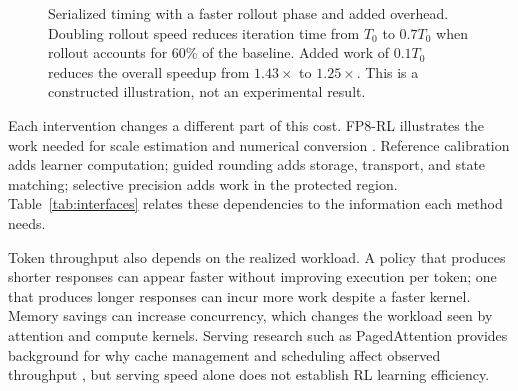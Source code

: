 \begin{figure}[!htb]
\centering
\caption{Serialized timing with a faster rollout phase and added overhead. Doubling rollout speed reduces iteration time from $T_0$ to $0.7T_0$ when rollout accounts for $60\%$ of the baseline. Added work of $0.1T_0$ reduces the overall speedup from $1.43\times$ to $1.25\times$. This is a constructed illustration, not an experimental result.}\label{fig:timing}
\end{figure}

Each intervention changes a different part of this cost. FP8-RL illustrates the work needed for scale estimation and numerical conversion \citep{fp8rl}. Reference calibration adds learner computation; guided rounding adds storage, transport, and state matching; selective precision adds work in the protected region. Table~\ref{tab:interfaces} relates these dependencies to the information each method needs.

Token throughput also depends on the realized workload. A policy that produces shorter responses can appear faster without improving execution per token; one that produces longer responses can incur more work despite a faster kernel. Memory savings can increase concurrency, which changes the workload seen by attention and compute kernels. Serving research such as PagedAttention provides background for why cache management and scheduling affect observed throughput \citep{pagedattention}, but serving speed alone does not establish RL learning efficiency.

